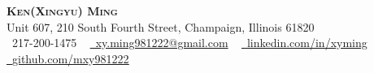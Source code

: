 \documentclass[letterpaper,11pt]{article}
\begin{document}

\begin{center}
    {\huge \scshape \textbf{Ken(Xingyu) Ming}} \\ \vspace{2pt}
    Unit 607, 210 South Fourth Street, Champaign, Illinois 61820 \\ \vspace{1pt}
    \small \raisebox{-0.1\height}\faPhone\ 217-200-1475 ~ \href{mailto:x@gmail.com}{\raisebox{-0.2\height}\faEnvelope\  xy.ming981222@gmail.com} ~ 
    \href{https://linkedin.com/in//}{\raisebox{-0.2\height}\faLinkedin\ \underline{linkedin.com/in/xyming}}  ~
    \href{https://github.com/}{\raisebox{-0.2\height}\faGithub\ \underline{github.com/mxy981222}}
    \vspace{-8pt}
\end{center}


\end{document}
